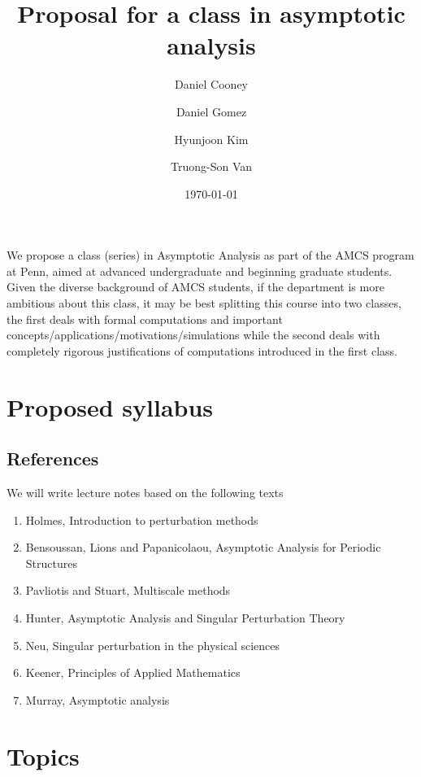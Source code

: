 \documentclass[12pt]{amsart}
\title{ Proposal for a class in asymptotic analysis }
\author{Daniel Cooney}
\author{Daniel Gomez}
\author{Hyunjoon Kim}
\author{Truong-Son Van}
\date{\today}
\begin{document}
\maketitle

We propose a class (series) in Asymptotic Analysis as part of the AMCS program at Penn,
aimed at advanced undergraduate and beginning graduate students.
Given the diverse background of AMCS students,
if the department is more ambitious about this class, it may be best splitting 
this course into two classes, the first deals with formal computations 
and important concepts/applications/motivations/simulations while the second
deals with completely rigorous justifications of computations introduced in the
first class.


\section{ Proposed syllabus}

\subsection*{References}

    We will write lecture notes based on the following texts
\begin{enumerate}
    \item Holmes, Introduction to perturbation methods~\cite{Holmes2013}
    \item Bensoussan, Lions and Papanicolaou, Asymptotic Analysis for Periodic Structures~\cite{BensoussanLionsPapanicolaou1978}
    \item Pavliotis and Stuart, Multiscale methods~\cite{PavliotisStuart2008}
    \item Hunter, Asymptotic Analysis and Singular Perturbation Theory~\cite{Hunter}
    \item Neu, Singular perturbation in the physical sciences~\cite{Neu2015}
    \item Keener, Principles of Applied Mathematics~\cite{Keener2000}
    \item Murray, Asymptotic analysis~\cite{Murray1984}
\end{enumerate}

\section*{Topics}
\end{document}
